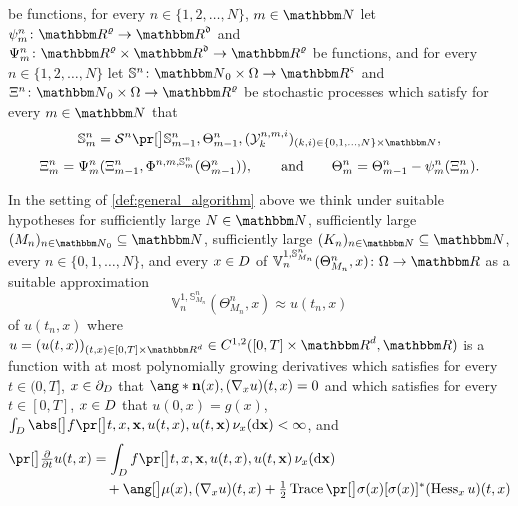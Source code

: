 \begin{algo}
		be functions,
	for every
		$n\in\{1,2,\ldots,N\}$,
		$m\in\N$
	let 
		$\psi^n_m\colon\R^{\varrho}\to\R^{\mathfrak{d}}$	and 
		$\Psi^n_m\colon\R^{\varrho}\times\R^{\mathfrak{d}}\to\R^{\varrho}$
		be functions,
	and for every
		$n\in\{1,2,\ldots,N\}$
	let
		$\bS^{n}\colon\N_0\times\Omega\to\R^{\varsigma}$ and
		$\Xi^{n}\colon\N_0\times\Omega\to\R^{\varrho}$
		be stochastic processes
		which satisfy 
			for every 
				$m\in\N$ 
			that
			\begin{equation}\label{eq:general_batch_normalization}
				\bS^{n}_{m} 
				= 
				\S^{n}\bpr{\bS^{n}_{m-1}, \Theta^{n}_{m-1},	(\Y_k^{n,m,i})_{(k,i)\in\{0,1,\ldots,N\}\times\N}}
				,
			\end{equation}
			\begin{equation}
				\label{eq:general_gradient_step}
				\Xi^n_{m} 
				=
				\Psi^n_{m}(\Xi^n_{m-1},\Phi^{n,m,\mathbb{S}^n_{m}}(\Theta^n_{m-1}))
				,
				\qquad\text{and}\qquad
				\Theta^{n}_{m} 
				=
				\Theta^{n}_{m-1} - \psi^n_{m}(\Xi^n_{m})
				.
			\end{equation}
\end{algo}
%
In the setting of \cref{def:general_algorithm} above
we think under suitable hypotheses 
for sufficiently large
$N \in \N$,
sufficiently large
$(M_n)_{n\in \N_0} \subseteq \N$,
sufficiently large 
$(K_n)_{n\in \N} \subseteq \N$,
%
every
$n \in \{0, 1, \dots, N\}$, 
and every 
$x \in D$
of 
$ \mathbb{V}^{1,\mathbb{S}_{M_n}^n}_n(\Theta^n_{M_n},x) \colon \Omega \to \R$ as a suitable approximation
\begin{equation}
\mathbb{V}^{1,\mathbb{S}_{M_n}^n}_n(\Theta^n_{M_n},x) \approx u(t_n,x)
\end{equation}
of $u(t_n,x)$ where
$
u=(u(t,x))_{(t,x)\in [0,T]\times\R^d}\in C^{1,2}([0,T]\times\R^d,\R)
$
is a function with at most  polynomially growing derivatives
%
which satisfies for every
$t\in (0,T]$,
$x\in \partial_D$
that
$ \ang*{\mathbf{n}(x) ,(\nabla_x u)(t,x)} = 0$
and which satisfies for every
$t\in [0,T]$,
$x\in D$
that
$u(0,x)=g(x)$,
$\int_\D \babs{f\bpr{t,x,\mathbf{x}, \allowbreak u(t,x), u(t,\mathbf{x})
} } \, \nu_x(\diff\mathbf{x}) < \infty$,
and
\begin{equation}
\label{eq:defPDE_general}
\begin{split}
\bpr{\tfrac{\partial}{\partial t}u}(t,x)
&=
\int_{\D} f\bpr{t,x,\mathbf{x}, u(t,x),u(t,\mathbf{x})
} \, \nu_x(\diff\mathbf{x}) \\
& \quad + \bang{\mu(x), ( \nabla_x u )( t,x ) }
+ \tfrac{ 1 }{ 2 }
\Trace\bpr{
\sigma(x) [ \sigma(x) ]^*
( \Hess_x u)( t,x )
}
\end{split}
\end{equation}
